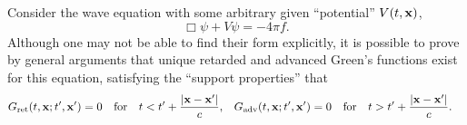 \documentclass[11pt]{article}
\newcommand{\vfix}{\vspace{-\baselineskip}}
\newcommand{\beq}{\begin{equation*}}
\newcommand{\eeq}{\end{equation*}}
\newenvironment{statement}[1]
{
	\section{#1}
	\color{darkgray}
	\ignorespaces
}
{
}
\begin{document}
\newcommand{\alp}{\alpha}
\newcommand{\del}{\delta}
\newcommand{\tht}{\theta}
\newcommand{\omg}{\omega}
\newcommand{\Omg}{\Omega}

\newcommand{\nq}{{n_1}}
\newcommand{\nw}{{n_2}}
\renewcommand{\ne}{{n_3}}

\newcommand{\vA}{\vb{A}}
\newcommand{\vp}{\vb{p}}
\newcommand{\vv}{\vb{v}}
\newcommand{\vx}{\vb{x}}

\newcommand{\Qij}{Q_{ij}}
\newcommand{\Qqq}{Q_{11}}

\newcommand{\dcx}{\dd[3]{x}}

\newcommand{\ret}{\text{ret}}

\renewcommand{\qq}{q_1}
\newcommand{\qw}{q_2}
\newcommand{\qe}{q_3}
\newcommand{\qr}{q_4}

\newcommand{\vxq}{\vx_1}
\newcommand{\vxw}{\vx_2}
\newcommand{\vxe}{\vx_3}
\newcommand{\vxr}{\vx_4}

\newcommand{\rhoq}{\rho_1}
\newcommand{\rhow}{\rho_2}
\newcommand{\rhoe}{\rho_3}
\newcommand{\rhor}{\rho_4}

\newcommand{\rh}{\vb{\hat{r}}}
\newcommand{\xh}{\vb{\hat{x}}}
\newcommand{\yh}{\vb{\hat{y}}}
\newcommand{\zh}{\vb{\hat{z}}}
\newcommand{\thh}{\boldsymbol{\hat{\tht}}}






\newcommand{\absx}{\abs{\vx}}
\newcommand{\sE}{\mathscr{E}}
\newcommand{\sEosc}{\sE_\text{osc}}
\newcommand{\alpo}{\alp_0}





\newcommand{\adv}{\text{adv}}
\newcommand{\Gadv}{G_\adv}
\newcommand{\Gret}{G_\ret}

\newcommand{\psiq}{\psi_1}
\newcommand{\psiw}{\psi_2}
 
\begin{statement}{}
	Consider the wave equation with some arbitrary given ``potential'' $V(t, \vx)$,
	\beq
		\Box \psi + V \psi = -4\pi f.
	\eeq
	Although one may not be able to find their form explicitly, it is possible to prove by general arguments that unique retarded and advanced Green's functions exist for this equation, satisfying the ``support properties'' that
	\begin{align*}
		\Gret(t, \vx; t', \vx') = 0 &\qfor t < t' + \frac{\abs{\vx - \vx'}}{c}, &
		\Gadv(t, \vx; t', \vx') = 0 &\qfor t > t' + \frac{\abs{\vx - \vx'}}{c}.
	\end{align*}
	\vfix
\end{statement}
\end{document}
